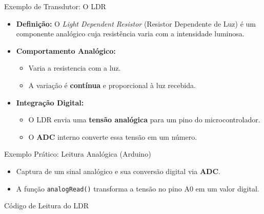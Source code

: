 \begin{frame}{Exemplo de Transdutor: O LDR}
    \begin{itemize}
        \item \textbf{Definição:} O \textit{Light Dependent Resistor} (Resistor Dependente de Luz) é um componente analógico cuja resistência varia com a intensidade luminosa.
        \item \textbf{Comportamento Analógico:}
              \begin{itemize}
                  \item Varia a resistencia com a luz.
                  \item A variação é \textbf{contínua} e proporcional à luz recebida.
              \end{itemize}
        \item \textbf{Integração Digital:}
              \begin{itemize}
                  \item O LDR envia uma \textbf{tensão analógica} para um pino do microcontrolador.
                  \item O \textbf{ADC} interno converte essa tensão em um número.
              \end{itemize}
    \end{itemize}


\end{frame}

\begin{frame}[fragile]{Exemplo Prático: Leitura Analógica (Arduino)}
    \begin{itemize}
        \item Captura de um sinal analógico e sua conversão digital via \textbf{ADC}.
        \item A função \texttt{analogRead()} transforma a tensão no pino A0 em um valor digital.
    \end{itemize}

    \begin{exampleblock}{Código de Leitura do LDR}

        

    \end{exampleblock}
\end{frame}

